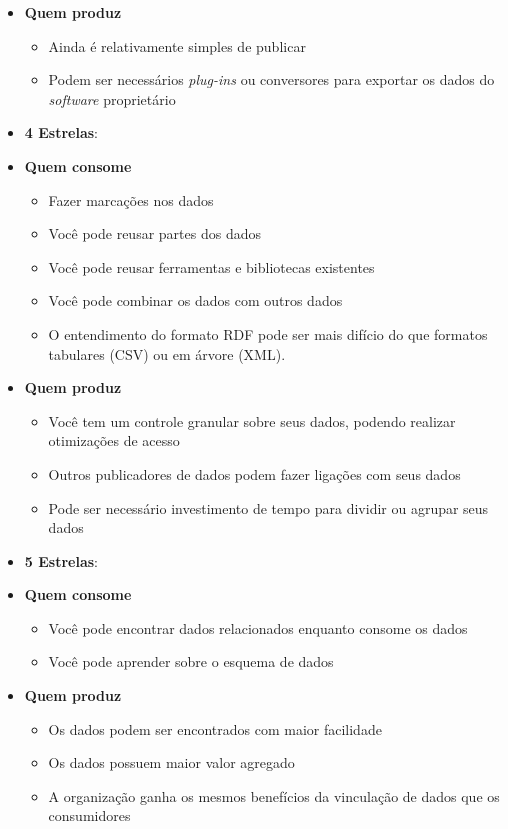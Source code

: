 \begin{itemize}
	\item[] \textbf{Quem produz}
		\begin{itemize}
			\itemsep0em
			\item Ainda é relativamente simples de publicar
			\item Podem ser necessários \emph{plug-ins} ou conversores para exportar os dados do \emph{software} proprietário
		\end{itemize}
\item \textbf{4 Estrelas}:
	\item[] \textbf{Quem consome}
		\begin{itemize}
			\itemsep0em
			\item Fazer marcações nos dados
			\item Você pode reusar partes dos dados
			\item Você pode reusar ferramentas e bibliotecas existentes
			\item Você pode combinar os dados com outros dados
			\item O entendimento do formato RDF pode ser mais difício do que formatos tabulares (CSV) ou em árvore (XML).
			
		\end{itemize}
		
	\item[] \textbf{Quem produz}
		\begin{itemize}
			\itemsep0em
			\item Você tem um controle granular sobre seus dados, podendo realizar otimizações de acesso
			\item Outros publicadores de dados podem fazer ligações com seus dados
			\item Pode ser necessário investimento de tempo para dividir ou agrupar seus dados
			
		\end{itemize}
\item \textbf{5 Estrelas}:
	\item[] \textbf{Quem consome}
		\begin{itemize}
			\itemsep0em
			\item Você pode encontrar dados relacionados enquanto consome os dados
			\item Você pode aprender sobre o esquema de dados	
		\end{itemize}
		
	\item[] \textbf{Quem produz}
		\begin{itemize}
			\itemsep0em
			\item Os dados podem ser encontrados com maior facilidade
			\item Os dados possuem maior valor agregado
			\item A organização ganha os mesmos benefícios da vinculação de dados que os consumidores
		\end{itemize}
\end{itemize}


